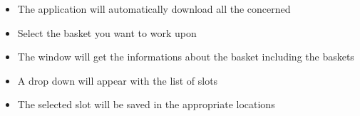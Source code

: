 \documentclass[letterpaper,10pt,english]{sphinxmanual}
\begin{document}
\begin{itemize}
\item {} 
The application will automatically download all the concerned

\end{itemize}

\begin{itemize}
\item {} 
Select the basket you want to work upon

\end{itemize}

\begin{itemize}
\item {} 
The window will get the informations about the basket including the baskets

\end{itemize}

\begin{itemize}
\item {} 
A drop down will appear with the list of slots

\end{itemize}

\begin{itemize}
\item {} 
The selected slot will be saved in the appropriate locations

\end{itemize}



\subsection{}
\label{\detokenize{user_manual:id2}}
\end{document}
